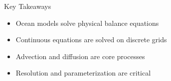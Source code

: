 \documentclass[english,aspectratio=169]{beamer}
\begin{document}
\begin{frame}{Key Takeaways}
\begin{itemize}
\item Ocean models solve physical balance equations
\item Continuous equations are solved on discrete grids
\item Advection and diffusion are core processes
\item Resolution and parameterization are critical
\end{itemize}
\end{frame}
\end{document}
